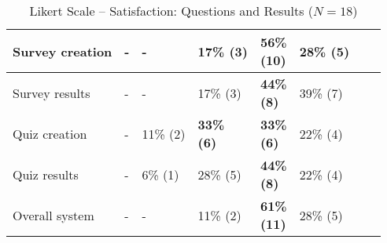 \begin{table}[h!]
{\begin{tabular}{| C{8cm} |p{0.7cm}|p{0.7cm}|p{0.7cm}|p{0.7cm}|p{0.7cm}|p{0.7cm}|p{0.7cm}|}
\hline Survey creation
	& - & - & 17\% \newline (3) & \textbf{56\% \newline (10)} & 28\% \newline (5) \\
\hline Survey results
	& - & - & 17\% \newline (3) & \textbf{44\% \newline (8)} & 39\% \newline (7) \\
\hline Quiz creation
	& - & 11\% \newline (2) & \textbf{33\% \newline (6)} & \textbf{33\% \newline (6)} & 22\% \newline (4) \\
\hline Quiz results
	& - & 6\% \newline (1) & 28\% \newline (5) & \textbf{44\% \newline (8)} & 22\% \newline (4) \\
\hline Overall system
	& - & - & 11\% \newline (2) & \textbf{61\% \newline (11)} & 28\% \newline (5) \\
\hline
\end{tabular}
}
\caption{Likert Scale -- Satisfaction: Questions and Results ($N = 18$)}
\label{table:satisfaction}
\end{table}

